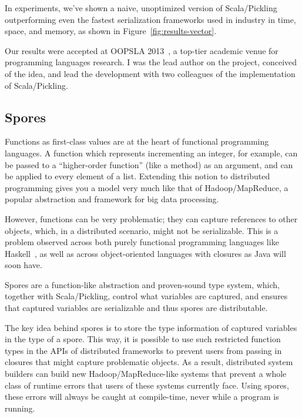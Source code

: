 \documentclass[acmtocl]{acmtrans2m}
\begin{document}
In experiments, we've shown a naive, unoptimized version of Scala/Pickling
outperforming even the fastest serialization frameworks used in industry in
time, space, and memory, as shown in Figure~\ref{fig:results-vector}.

Our results were accepted at OOPSLA 2013~\cite{Pickling}, a top-tier academic
venue for programming languages research. I was the lead author on the
project, conceived of the idea, and lead the development with two colleagues
of the implementation of Scala/Pickling.

\vspace{-0.2in}
\subsection*{\textbf{Spores}}
\vspace{-0.1in}

Functions as first-class values are at the heart of functional programming
languages. A function which represents incrementing an integer, for example,
can be passed to a ``higher-order function'' (like a method) as an argument,
and can be applied to every element of a list. Extending this notion to
distributed programming gives you a model very much like that of
Hadoop/MapReduce, a popular abstraction and framework for big data processing.

However, functions can be very problematic; they can capture references to
other objects, which, in a distributed scenario, might not be serializable.
This is a problem observed across both purely functional programming languages
like Haskell~\cite{CloudHaskell}, as well as across object-oriented languages
with closures as Java will soon have.

Spores are a function-like abstraction and proven-sound type system, which,
together with Scala/Pickling, control what variables are captured, and ensures
that captured variables are serializable and thus spores are distributable.

The key idea behind spores is to store the type information of captured
variables in the type of a spore. This way, it is possible to use such restricted
function types in the APIs of distributed frameworks to prevent users from passing in
closures that might capture problematic objects.
As a result, distributed system builders can build new Hadoop/MapReduce-like systems
that prevent a whole class of runtime errors that users of these systems currently face.
Using spores, these errors will always be caught at
compile-time, never while a program is running.
\end{document}
